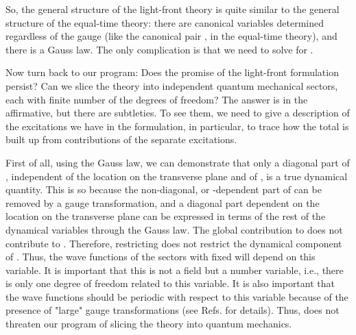 \documentclass[a4paper,12pt]{article}
\begin{document}
So, the general structure of the light-front theory 
is quite similar to the general 
structure of the equal-time theory: there are canonical variables determined 
regardless of the gauge (like the canonical pair 
\coordHE{}, \coordHE{} in the equal-time
theory), and there is a Gauss law. The only complication 
is that we need to solve for \coordHE{}. 

Now turn back to our program: Does the promise of 
the light-front formulation persist? 
Can we slice the theory into independent quantum mechanical sectors, 
each with 
finite number of the degrees of freedom? The answer 
is in the affirmative, but there are subtleties. 
To see them, we need to give a description of the 
excitations we have in the formulation, in particular, 
to trace how the total \coordHE{} 
is built up from contributions of the separate excitations.

First of all, using the Gauss law, we can demonstrate that 
only a diagonal part of \coordHE{}, independent of the location 
on the transverse plane and of \coordHE{}, is a true 
dynamical quantity. This is so because the 
non-diagonal, or \coordHE{}-dependent part of \coordHE{} 
can be removed by a gauge 
transformation, and a diagonal part 
dependent on the location on the transverse plane can 
be expressed in terms of the 
rest of the dynamical variables through the Gauss law. 
The global contribution to \coordHE{} does not contribute to \coordHE{}. 
Therefore, restricting \coordHE{} does not restrict the dynamical 
component of \coordHE{}. Thus, the wave functions of the 
sectors with fixed \coordHE{} will depend on this variable. 
It is important that this is 
not a field but a number variable, i.e., there is only 
one degree of freedom related 
to this variable. 
It is also important that the wave functions 
should be periodic with 
respect to this variable because of the presence of "large" 
gauge transformations 
(see Refs. \cite{KMPV,Martinovic} for details). Thus, \coordHE{} does 
not threaten our 
program of slicing the theory into quantum mechanics.
\end{document}
